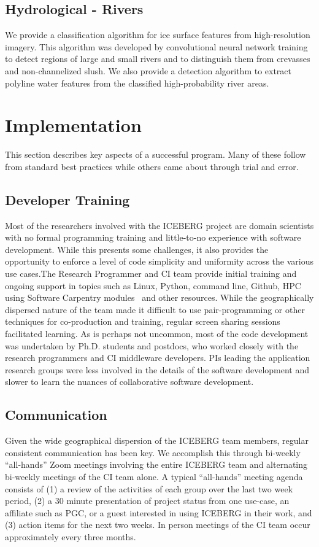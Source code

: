 \documentclass[manuscript,screen]{acmart}
\begin{document}
\subsection{Hydrological - Rivers}
We provide a classification algorithm for ice surface features from high-resolution imagery. This algorithm was developed by convolutional neural network training to detect regions of large and small rivers and to distinguish them from crevasses and non-channelized slush. We also provide a detection algorithm to extract polyline water features from the classified high-probability river areas. 

\section{Implementation}
This section describes key aspects of a successful program.  Many of these 
follow from standard best practices while others came about through trial and error.


\subsection{Developer Training}
Most of the researchers involved with the ICEBERG project are domain scientists with no formal programming training and little-to-no experience with software development. While this presents some challenges, it also provides the opportunity to enforce a level of code simplicity and uniformity across the various use cases.The Research Programmer and CI team provide initial training and ongoing support in topics such as Linux, Python, command line, Github, HPC using Software Carpentry modules~\cite{SWweb:20} and other resources. While the geographically dispersed nature of the team made it difficult to use pair-programming or other techniques for co-production and training, regular screen sharing sessions facilitated learning. As is perhaps not uncommon, most of the code development was undertaken by Ph.D. students and postdocs, who worked closely with the research programmers and CI middleware developers. PIs leading the application research groups were less involved in the details of the software development and slower to learn the nuances of collaborative software development.

\subsection{Communication}
Given the wide geographical dispersion of the ICEBERG team members, regular consistent communication has been key. We accomplish this through bi-weekly “all-hands” Zoom meetings involving the entire ICEBERG team and alternating bi-weekly meetings of the CI team alone. A typical “all-hands” meeting agenda consists of (1) a review of the activities of each group over the last two week period, (2) a 30 minute presentation of project status from one use-case, an affiliate such as PGC, or a guest interested in using ICEBERG in their work, and (3) action items for the next two weeks. In person meetings of the CI team occur approximately every three months.
\end{document}

